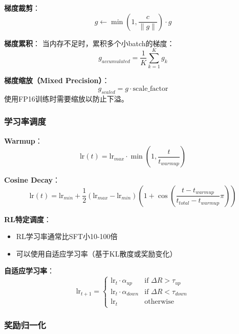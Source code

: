 \documentclass[12pt,a4paper]{article}
\begin{document}
\textbf{梯度裁剪}：
\begin{equation}
g \leftarrow \min\left(1, \frac{c}{\|g\|}\right) \cdot g
\end{equation}

\textbf{梯度累积}：
当内存不足时，累积多个小batch的梯度：
\begin{equation}
g_{accumulated} = \frac{1}{K}\sum_{k=1}^{K} g_k
\end{equation}

\textbf{梯度缩放（Mixed Precision）}：
\begin{equation}
g_{scaled} = g \cdot \text{scale\_factor}
\end{equation}
使用FP16训练时需要缩放以防止下溢。

\subsubsection{学习率调度}

\textbf{Warmup}：
\begin{equation}
\text{lr}(t) = \text{lr}_{max} \cdot \min\left(1, \frac{t}{t_{warmup}}\right)
\end{equation}

\textbf{Cosine Decay}：
\begin{equation}
\text{lr}(t) = \text{lr}_{min} + \frac{1}{2}(\text{lr}_{max} - \text{lr}_{min})\left(1 + \cos\left(\frac{t - t_{warmup}}{t_{total} - t_{warmup}}\pi\right)\right)
\end{equation}

\textbf{RL特定调度}：
\begin{itemize}
    \item RL学习率通常比SFT小10-100倍
    \item 可以使用自适应学习率（基于KL散度或奖励变化）
\end{itemize}

\textbf{自适应学习率}：
\begin{equation}
\text{lr}_{t+1} = \begin{cases}
\text{lr}_t \cdot \alpha_{up} & \text{if } \Delta R > \tau_{up} \\
\text{lr}_t \cdot \alpha_{down} & \text{if } \Delta R < \tau_{down} \\
\text{lr}_t & \text{otherwise}
\end{cases}
\end{equation}

\subsubsection{奖励归一化}
\end{document}
